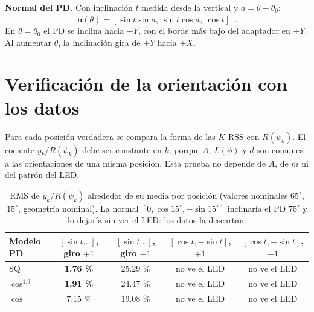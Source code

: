\documentclass[11pt,a4paper]{article}
\begin{document}
\textbf{Normal del PD.} Con inclinación $t$ medida desde la vertical y $a=\theta-\theta_0$:
\begin{equation}
\mathbf n(\theta)=[\sin t\sin a,\ \sin t\cos a,\ \cos t]^{\mathsf T}.
\end{equation}
En $\theta=\theta_0$ el PD se inclina hacia $+Y$, con el borde más bajo del adaptador en $+Y$. Al aumentar $\theta$, la inclinación gira de $+Y$ hacia $+X$.

\section{Verificación de la orientación con los datos}
Para cada posición verdadera se compara la forma de las $K$ RSS con $R(\psi_k)$. El cociente $y_k/R(\psi_k)$ debe ser constante en $k$, porque $A$, $L(\phi)$ y $d$ son comunes a las orientaciones de una misma posición. Esta prueba no depende de $A$, de $m$ ni del patrón del LED.

\begin{table}[H]\centering\small
\begin{tabular}{lcccc}\toprule
Modelo PD & $[\sin t\ldots]$, giro $+1$ & $[\sin t\ldots]$, giro $-1$ & $[\cos t,-\sin t]$, $+1$ & $[\cos t,-\sin t]$, $-1$\\\midrule
SQ & \textbf{1.76 \%} & 25.29 \% & no ve el LED & no ve el LED\\
$\cos^{1.9}$ & \textbf{1.91 \%} & 24.47 \% & no ve el LED & no ve el LED\\
$\cos$ & 7.15 \% & 19.08 \% & no ve el LED & no ve el LED\\\bottomrule
\end{tabular}
\caption{RMS de $y_k/R(\psi_k)$ alrededor de su media por posición (valores nominales $65^\circ$, $15^\circ$, geometría nominal). La normal $[0,\cos15^\circ,-\sin15^\circ]$ inclinaría el PD $75^\circ$ y lo dejaría sin ver el LED: los datos la descartan.}
\end{table}
\end{document}
